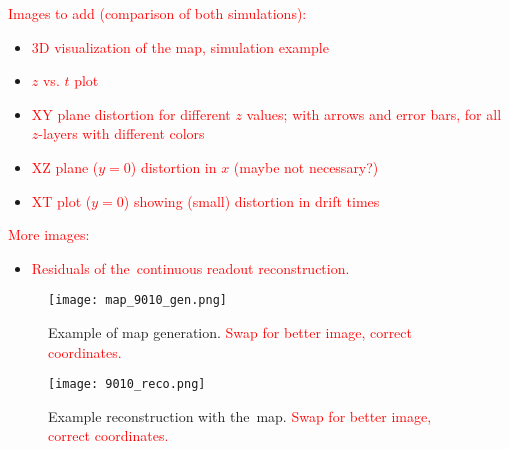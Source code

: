 		\textcolor{red}{Images to add (comparison of both simulations):}
		\begin{itemize}
			\item \textcolor{red}{3D visualization of the map, simulation example}
			\item \textcolor{red}{$z$ vs. $t$ plot}
			\item \textcolor{red}{XY plane distortion for different $z$ values; with arrows and error bars, for all $z$-layers with different colors}
			\item \textcolor{red}{XZ plane ($y = 0$) distortion in $x$ (maybe not necessary?)}
			\item \textcolor{red}{XT plot ($y = 0$) showing (small) distortion in drift times}
		\end{itemize}
		
		\textcolor{red}{More images:}
		\begin{itemize}
			\item \textcolor{red}{Residuals of the~continuous readout reconstruction.}
		\end{itemize}		
		
		\begin{figure}[H]
			\centering
			\texttt{[image: map\_9010\_gen.png]}
			\caption{Example of map generation. \textcolor{red}{Swap for better image, correct coordinates.}}
			\label{fig:map9010gen}
		\end{figure}
		
		\begin{figure}[H]
			\centering
			\texttt{[image: 9010\_reco.png]}
			\caption{Example reconstruction with the~map. \textcolor{red}{Swap for better image, correct coordinates.}}
			\label{fig:9010reco}
		\end{figure}
		
